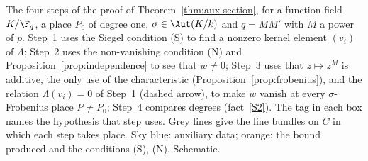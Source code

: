 \caption{The four steps of the proof of Theorem~\ref{thm:aux-section}, for a
function field $K/\F_q$, a place $P_0$ of degree one,
$\sigma\in\Aut(K/k)$ and $q=MM'$ with $M$ a power of $p$. Step~1 uses the
Siegel condition (S) to find a nonzero kernel element $(v_i)$ of
$\Lambda$; Step~2 uses the non-vanishing condition (N) and
Proposition~\ref{prop:independence} to see that $w\ne0$; Step~3 uses that
$z\mapsto z^M$ is additive, the only use of the characteristic
(Proposition~\ref{prop:frobenius}), and the relation $\Lambda(v_i)=0$ of
Step~1 (dashed arrow), to make $w$ vanish at every $\sigma$-Frobenius place
$P\ne P_0$; Step~4 compares degrees (fact~\ref{S2}). The tag in each box
names the hypothesis that step uses. Grey lines give the line bundles on
$C$ in which each step takes place. Sky blue: auxiliary data; orange: the
bound produced and the conditions (S), (N). Schematic.}
\label{fig:four-steps}
